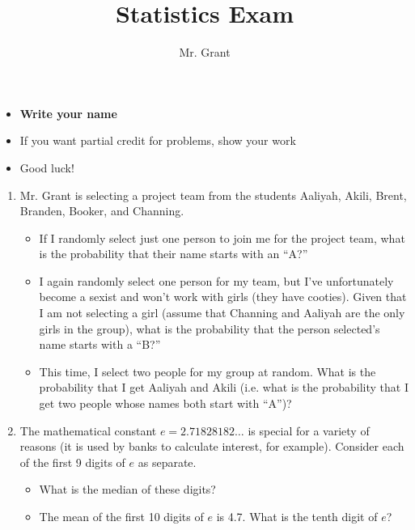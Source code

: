 \documentclass[12pt]{article}
\begin{document}
\title{Statistics Exam}
\author{Mr. Grant}
\maketitle

\begin{itemize}
	\item \textbf{Write your name}
	\item If you want partial credit for problems, show your work
	\item Good luck!
\end{itemize}

\begin{enumerate}[itemsep=-1ex]

	\item Mr. Grant is selecting a project team from the students Aaliyah, Akili, Brent, Branden, Booker, and Channing.
	\begin{itemize}
		\item If I randomly select just one person to join me for the project team, what is the probability that their name starts with an ``A?'' \vspace{10mm}
		\item I again randomly select one person for my team, but I've unfortunately become a sexist and won't work with girls (they have cooties). Given that I am not selecting a girl (assume that Channing and Aaliyah are the only girls in the group), what is the probability that the person selected's name starts with a ``B?'' \vspace{10mm}
		\item This time, I select two people for my group at random. What is the probability that I get Aaliyah and Akili (i.e. what is the probability that I get two people whose names both start with ``A'')? \vspace{15mm}
	\end{itemize}

	\item The mathematical constant $e = 2.71828182 \ldots$ is special for a variety of reasons (it is used by banks to calculate interest, for example). Consider each of the first 9 digits of $e$ as separate.
	\begin{itemize}
		\item What is the median of these digits? \vspace{10mm}
		\item The mean of the first 10 digits of $e$ is 4.7. What is the tenth digit of $e$? \vspace{10mm}
	\end{itemize}


\end{enumerate}
\end{document}
